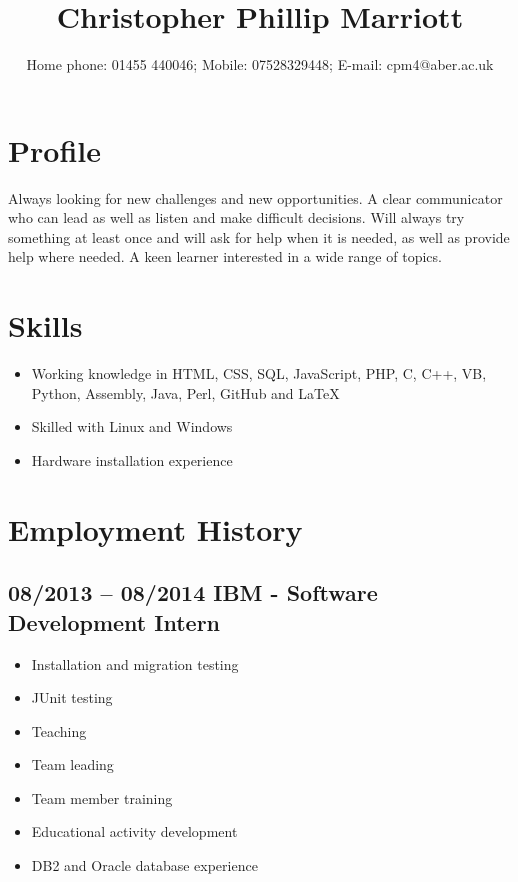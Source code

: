 \documentclass[0pt]{article}
\title{Christopher Phillip Marriott}
\date{Home phone: 01455  440046; Mobile: 07528329448; E-mail: cpm4@aber.ac.uk}
\begin{document}
\maketitle
\thispagestyle{empty}
\pagestyle{empty}

\section*{Profile}
Always looking for new challenges and new opportunities. A clear communicator who can lead as well as listen and make difficult decisions. Will always try something at least once and will ask for help when it is needed, as well as provide help where needed.  A keen learner interested in a wide range of topics.


\section*{Skills}
\begin{itemize}
	\item Working knowledge in HTML, CSS, SQL, JavaScript, PHP, C, C++, VB, Python, Assembly, Java, Perl, GitHub and LaTeX 
	\item Skilled with Linux and Windows
	\item Hardware installation experience
\end{itemize}

\section*{Employment History}

\subsection*{08/2013 -- 08/2014   IBM - Software Development Intern}
\begin{itemize}
	\item Installation and migration testing
	\item JUnit testing 
	\item Teaching
	\item Team leading
	\item Team member training 
	\item Educational activity development
	\item DB2 and Oracle database experience
\end{itemize}
\end{document}
